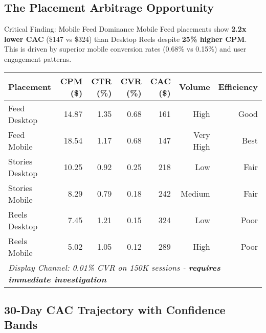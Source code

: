 \documentclass[11pt,a4paper]{report}
\begin{document}
\subsection{The Placement Arbitrage Opportunity}

\begin{insightbox}{Critical Finding: Mobile Feed Dominance}
Mobile Feed placements show \textbf{2.2x lower CAC} (\$147 vs \$324) than Desktop Reels despite \textbf{25\% higher CPM}. This is driven by superior mobile conversion rates (0.68\% vs 0.15\%) and user engagement patterns.
\end{insightbox}

\begin{center}
\begin{tabular}{|l|r|r|r|r|r|r|}
\hline
\rowcolor{aelpblue!20}
\textbf{Placement} & \textbf{CPM (\$)} & \textbf{CTR (\%)} & \textbf{CVR (\%)} & \textbf{CAC (\$)} & \textbf{Volume} & \textbf{Efficiency} \\
\hline
Feed Desktop & 14.87 & 1.35 & 0.68 & 161 & High & \cellcolor{aelpgreen!20}Good \\
Feed Mobile & 18.54 & 1.17 & 0.68 & \cellcolor{aelpgreen!30}147 & Very High & \cellcolor{aelpgreen!30}Best \\
Stories Desktop & 10.25 & 0.92 & 0.25 & 218 & Low & \cellcolor{aelporange!20}Fair \\
Stories Mobile & 8.29 & 0.79 & 0.18 & 242 & Medium & \cellcolor{aelporange!20}Fair \\
Reels Desktop & 7.45 & 1.21 & 0.15 & \cellcolor{aelpred!20}324 & Low & \cellcolor{aelpred!20}Poor \\
Reels Mobile & 5.02 & 1.05 & 0.12 & 289 & High & \cellcolor{aelpred!20}Poor \\
\hline
\multicolumn{7}{|l|}{\textit{Display Channel: 0.01\% CVR on 150K sessions - \textbf{requires immediate investigation}}} \\
\hline
\end{tabular}
\end{center}

\subsection{30-Day CAC Trajectory with Confidence Bands}
\end{document}
